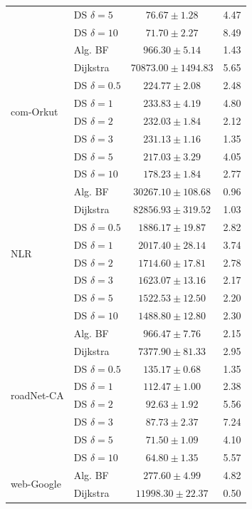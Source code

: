 \documentclass[a4paper]{article}
\begin{document}
\begin{table}[h!]
\begin{minipage}{0.48\textwidth}
\begin{tabular}{llcc}
    & DS $\delta=5$ & $76.67 \pm 1.28$ & 4.47 \\
    & DS $\delta=10$ & $71.70 \pm 2.27$ & 8.49 \\
\midrule
\multirow{8}{*}{com-Orkut}
    & Alg. BF & $966.30 \pm 5.14$ & 1.43 \\
    & Dijkstra & $70873.00 \pm 1494.83$ & 5.65 \\
    & DS $\delta=0.5$ & $224.77 \pm 2.08$ & 2.48 \\
    & DS $\delta=1$ & $233.83 \pm 4.19$ & 4.80 \\
    & DS $\delta=2$ & $232.03 \pm 1.84$ & 2.12 \\
    & DS $\delta=3$ & $231.13 \pm 1.16$ & 1.35 \\
    & DS $\delta=5$ & $217.03 \pm 3.29$ & 4.05 \\
    & DS $\delta=10$ & $178.23 \pm 1.84$ & 2.77 \\
\midrule
\multirow{8}{*}{NLR}
    & Alg. BF & $30267.10 \pm 108.68$ & 0.96 \\
    & Dijkstra & $82856.93 \pm 319.52$ & 1.03 \\
    & DS $\delta=0.5$ & $1886.17 \pm 19.87$ & 2.82 \\
    & DS $\delta=1$ & $2017.40 \pm 28.14$ & 3.74 \\
    & DS $\delta=2$ & $1714.60 \pm 17.81$ & 2.78 \\
    & DS $\delta=3$ & $1623.07 \pm 13.16$ & 2.17 \\
    & DS $\delta=5$ & $1522.53 \pm 12.50$ & 2.20 \\
    & DS $\delta=10$ & $1488.80 \pm 12.80$ & 2.30 \\
\midrule
\multirow{8}{*}{roadNet-CA}
    & Alg. BF & $966.47 \pm 7.76$ & 2.15 \\
    & Dijkstra & $7377.90 \pm 81.33$ & 2.95 \\
    & DS $\delta=0.5$ & $135.17 \pm 0.68$ & 1.35 \\
    & DS $\delta=1$ & $112.47 \pm 1.00$ & 2.38 \\
    & DS $\delta=2$ & $92.63 \pm 1.92$ & 5.56 \\
    & DS $\delta=3$ & $87.73 \pm 2.37$ & 7.24 \\
    & DS $\delta=5$ & $71.50 \pm 1.09$ & 4.10 \\
    & DS $\delta=10$ & $64.80 \pm 1.35$ & 5.57 \\
\midrule
\multirow{8}{*}{web-Google}
    & Alg. BF & $277.60 \pm 4.99$ & 4.82 \\
    & Dijkstra & $11998.30 \pm 22.37$ & 0.50 \\

\end{tabular}
\end{minipage}
\end{table}
\end{document}
